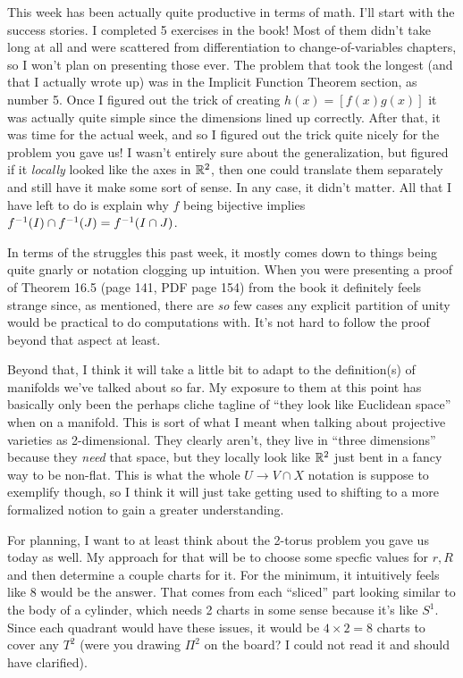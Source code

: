 \documentclass[12pt]{article}
\author{Sam Price}
\title{\reflectbox{Reflection Six}}
\begin{document}
\maketitle

This week has been actually quite productive in terms of math.
I'll start with the success stories.
I completed 5 exercises in the book!
Most of them didn't take long at all and were scattered from differentiation to
change-of-variables chapters, so I won't plan on presenting those ever.
The problem that took the longest (and that I actually wrote up)
was in the Implicit Function Theorem section, as number 5.
Once I figured out the trick of creating $h(x) = [f(x) g(x)]$
it was actually quite simple since the dimensions lined up correctly.
After that, it was time for the actual week, and so I figured out the trick quite nicely
for the problem you gave us! I wasn't entirely sure about the generalization, but figured
if it \emph{locally} looked like the axes in $\RR[2]$, then one could translate them separately
and still have it make some sort of sense. In any case, it didn't matter. All that I have left
to do is explain why $f$ being bijective implies $f\inv(I) \cap f\inv(J) = f\inv(I \cap J)$.

In terms of the struggles this past week, it mostly comes down to things being quite gnarly
or notation clogging up intuition. When you were presenting a proof of Theorem 16.5
(page 141, PDF page 154) from the book it definitely feels strange since, as mentioned, there
are \emph{so} few cases any explicit partition of unity would be practical to do computations
with. It's not hard to follow the proof beyond that aspect at least.

Beyond that, I think it will take a little bit to adapt to the definition(s) of manifolds we've
talked about so far. My exposure to them at this point has basically only been the perhaps cliche
tagline of ``they look like Euclidean space'' when on a manifold. This is sort of what I meant
when talking about projective varieties as 2-dimensional. They clearly aren't, they live in
``three dimensions'' because they \emph{need} that space, but they locally look like $\RR[2]$
just bent in a fancy way to be non-flat. This is what the whole $U \to V \cap X$ notation is suppose
to exemplify though, so I think it will just take getting used to shifting to a more formalized
notion to gain a greater understanding.

For planning, I want to at least think about the 2-torus problem you gave us today as well.
My approach for that will be to choose some specfic values for $r, R$ and then determine
a couple charts for it. For the minimum, it intuitively feels like 8 would be the answer.
That comes from each ``sliced'' part looking similar to the body of a cylinder,
which needs 2 charts in some sense because it's like $S^{1}$. Since each quadrant would have these
issues, it would be $4 \times 2 = 8$ charts to cover any $T^{2}$
(were you drawing $\Pi^{2}$ on the board? I could not read it and should have clarified).
\end{document}
